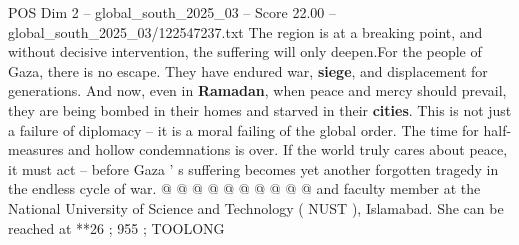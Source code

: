 \begin{textsample}{POS Dim 2 – global\_south\_2025\_03 – Score 22.00 – global\_south\_2025\_03/122547237.txt}
The region is at a breaking point, and without decisive intervention, the suffering will only deepen.For the people of Gaza, there is no escape.
They have endured war, \textbf{siege}, and displacement for generations.
And now, even in \textbf{Ramadan}, when peace and mercy should prevail, they are being bombed in their homes and starved in their \textbf{cities}.
This is not just a failure of diplomacy -- it is a moral failing of the global order.
The time for half-measures and hollow condemnations is over.
If the world truly cares about peace, it must act -- before Gaza ' s suffering becomes yet another forgotten tragedy in the endless cycle of war. @ @ @ @ @ @ @ @ @ @ and faculty member at the National University of Science and Technology ( NUST ), Islamabad.
She can be reached at **26 ; 955 ; TOOLONG

\end{textsample}
